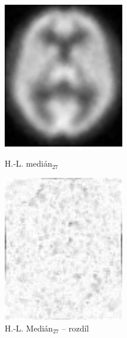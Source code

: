     \begin{figure}[h]
        \begin{minipage}[l]{0.5\textwidth}
            \center
            \includegraphics[width = 150pt]{src/8Appendix/final/10-100wmed.png}
            \caption{H.-L. medián$_{27}$}
        \end{minipage}
        \begin{minipage}[r]{0.5\textwidth}
            \center
            \includegraphics[width = 150pt]{src/8Appendix/final/10-100wmedD.png}
            \caption{H.-L. Medián$_{27}$ -- rozdíl}
        \end{minipage}
    \end{figure}
    
